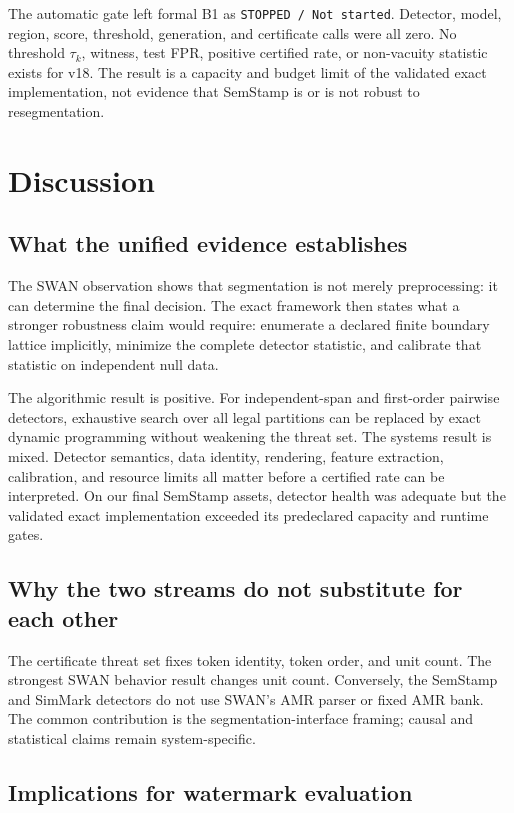 \documentclass[10pt]{article}
\begin{document}
The automatic gate left formal B1 as \texttt{STOPPED / Not started}.
Detector, model, region, score, threshold, generation, and certificate calls
were all zero. No threshold $\tau_k$, witness, test FPR, positive certified
rate, or non-vacuity statistic exists for v18. The result is a capacity and
budget limit of the validated exact implementation, not evidence that
SemStamp is or is not robust to resegmentation.

\section{Discussion}

\subsection{What the unified evidence establishes}

The SWAN observation shows that segmentation is not merely preprocessing:
it can determine the final decision. The exact framework then states what a
stronger robustness claim would require: enumerate a declared finite
boundary lattice implicitly, minimize the complete detector statistic, and
calibrate that statistic on independent null data.

The algorithmic result is positive. For independent-span and first-order
pairwise detectors, exhaustive search over all legal partitions can be
replaced by exact dynamic programming without weakening the threat set. The
systems result is mixed. Detector semantics, data identity, rendering,
feature extraction, calibration, and resource limits all matter before a
certified rate can be interpreted. On our final SemStamp assets, detector
health was adequate but the validated exact implementation exceeded its
predeclared capacity and runtime gates.

\subsection{Why the two streams do not substitute for each other}

The certificate threat set fixes token identity, token order, and unit count.
The strongest SWAN behavior result changes unit count. Conversely, the
SemStamp and SimMark detectors do not use SWAN's AMR parser or fixed AMR bank.
The common contribution is the segmentation-interface framing; causal and
statistical claims remain system-specific.

\subsection{Implications for watermark evaluation}
\end{document}
